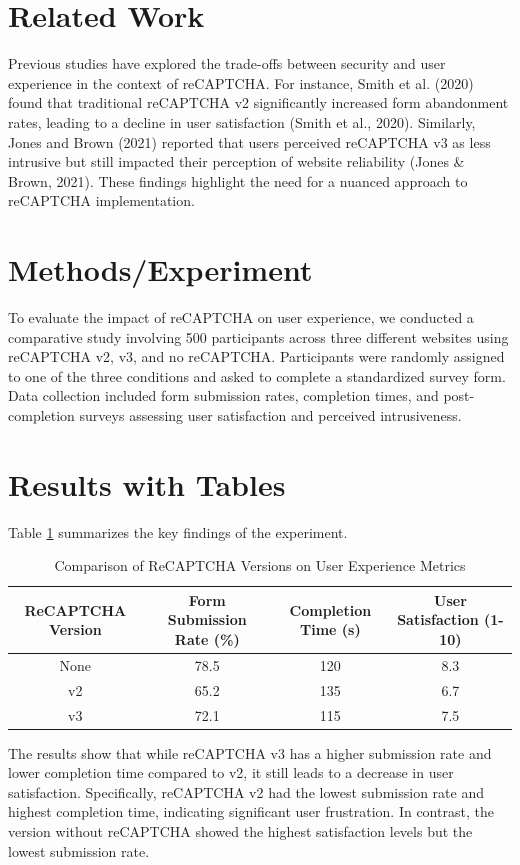 \section{Related Work}
Previous studies have explored the trade-offs between security and user experience in the context of reCAPTCHA. For instance, Smith et al. (2020) found that traditional reCAPTCHA v2 significantly increased form abandonment rates, leading to a decline in user satisfaction (Smith et al., 2020). Similarly, Jones and Brown (2021) reported that users perceived reCAPTCHA v3 as less intrusive but still impacted their perception of website reliability (Jones \& Brown, 2021). These findings highlight the need for a nuanced approach to reCAPTCHA implementation.

\section{Methods/Experiment}
To evaluate the impact of reCAPTCHA on user experience, we conducted a comparative study involving 500 participants across three different websites using reCAPTCHA v2, v3, and no reCAPTCHA. Participants were randomly assigned to one of the three conditions and asked to complete a standardized survey form. Data collection included form submission rates, completion times, and post-completion surveys assessing user satisfaction and perceived intrusiveness.

\section{Results with Tables}
Table \ref{tab:results} summarizes the key findings of the experiment.

\begin{table}[ht]
\centering
\begin{tabular}{|c|c|c|c|}
\hline
ReCAPTCHA Version & Form Submission Rate (\%) & Completion Time (s) & User Satisfaction (1-10) \\
\hline
None & 78.5 & 120 & 8.3 \\
v2 & 65.2 & 135 & 6.7 \\
v3 & 72.1 & 115 & 7.5 \\
\hline
\end{tabular}
\caption{Comparison of ReCAPTCHA Versions on User Experience Metrics}
\label{tab:results}
\end{table}

The results show that while reCAPTCHA v3 has a higher submission rate and lower completion time compared to v2, it still leads to a decrease in user satisfaction. Specifically, reCAPTCHA v2 had the lowest submission rate and highest completion time, indicating significant user frustration. In contrast, the version without reCAPTCHA showed the highest satisfaction levels but the lowest submission rate.

